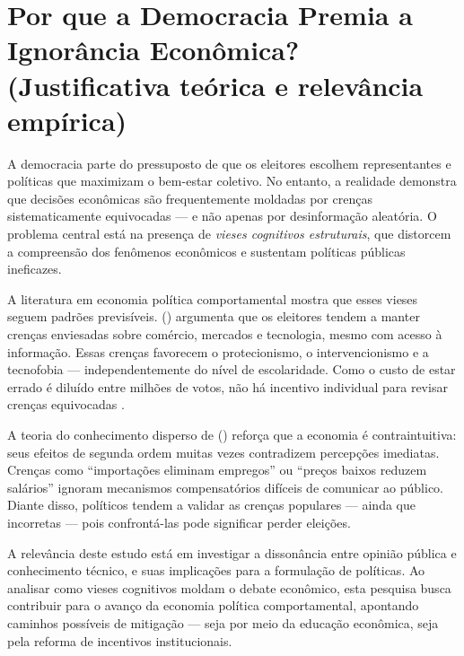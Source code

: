 \section{Por que a Democracia Premia a Ignorância Econômica?
(Justificativa teórica e relevância empírica)} %

A democracia parte do pressuposto de que os eleitores escolhem representantes e políticas que maximizam o bem-estar coletivo. No entanto, a realidade demonstra que decisões econômicas são frequentemente moldadas por crenças sistematicamente equivocadas — e não apenas por desinformação aleatória. O problema central está na presença de \textit{vieses cognitivos estruturais}, que distorcem a compreensão dos fenômenos econômicos e sustentam políticas públicas ineficazes.

A literatura em economia política comportamental mostra que esses vieses seguem padrões previsíveis.  (\citeyear{The_Myth_of_the_Rational_Voter}) argumenta que os eleitores tendem a manter crenças enviesadas sobre comércio, mercados e tecnologia, mesmo com acesso à informação. Essas crenças favorecem o protecionismo, o intervencionismo e a tecnofobia — independentemente do nível de escolaridade. Como o custo de estar errado é diluído entre milhões de votos, não há incentivo individual para revisar crenças equivocadas \cite{downs1957economic}.

A teoria do conhecimento disperso de  (\citeyear{hayek_knowledge_use}) reforça que a economia é contraintuitiva: seus efeitos de segunda ordem muitas vezes contradizem percepções imediatas. Crenças como ``importações eliminam empregos'' ou ``preços baixos reduzem salários'' ignoram mecanismos compensatórios difíceis de comunicar ao público. Diante disso, políticos tendem a validar as crenças populares — ainda que incorretas — pois confrontá-las pode significar perder eleições.

A relevância deste estudo está em investigar a dissonância entre opinião pública e conhecimento técnico, e suas implicações para a formulação de políticas. Ao analisar como vieses cognitivos moldam o debate econômico, esta pesquisa busca contribuir para o avanço da economia política comportamental, apontando caminhos possíveis de mitigação — seja por meio da educação econômica, seja pela reforma de incentivos institucionais.

